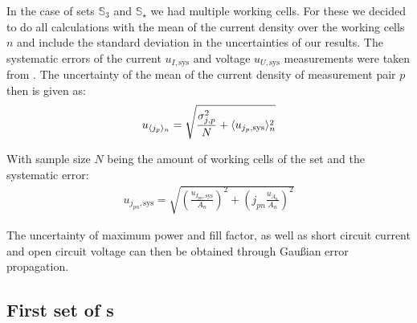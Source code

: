 \documentclass[a4paper,10pt,twocolumn]{article}
\begin{document}
\begin{extract*}
In the case of sets $\mathbb{S}_3$ and $\mathbb{S}_\star$ we had multiple working cells. For these we decided to do all calculations with the mean of the current density over the working cells $n$ and include the standard deviation in the uncertainties of our results. The systematic errors of the current $u_{I,\text{sys}}$ and voltage $u_{U,\text{sys}}$ measurements were taken from \cite{keithley}. The uncertainty of the mean of the current density of measurement pair $p$ then is given as:
\begin{align}
	u_{\langle j_p \rangle_n} = \sqrt{\frac{\sigma_{j,p}^2}{N} + \langle u_{j_p,\text{sys}} \rangle_n^2}
\end{align}

With sample size $N$ being the amount of working cells of the set and the systematic error:
\begin{align}
	u_{j_{pn},\text{sys}} = \sqrt{ \left( \frac{ u_{I_{pn},\text{sys}}}{A_n}\right)^2+\left( j_{pn}\frac{u_{A_n}}{A_n} \right)^2}
\end{align}

The uncertainty of maximum power and fill factor, as well as short circuit current and open circuit voltage can then be obtained through Gaußian error propagation.

\subsection{First set of \BHSC s}\label{subsec:S1data}


\end{extract*}
\end{document}
